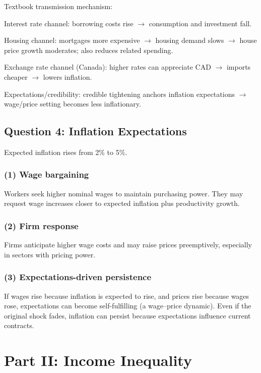 \documentclass[11pt]{article}
\begin{document}
Textbook transmission mechanism:

Interest rate channel: borrowing costs rise \(\rightarrow\) consumption and investment fall.

Housing channel: mortgages more expensive \(\rightarrow\) housing demand slows \(\rightarrow\) house price growth moderates; also reduces related spending.

Exchange rate channel (Canada): higher rates can appreciate CAD \(\rightarrow\) imports cheaper \(\rightarrow\) lowers inflation.

Expectations/credibility: credible tightening anchors inflation expectations \(\rightarrow\) wage/price setting becomes less inflationary.

\subsection*{Question 4: Inflation Expectations}

Expected inflation rises from 2\% to 5\%.

\subsubsection*{(1) Wage bargaining}

Workers seek higher nominal wages to maintain purchasing power. They may request wage increases closer to expected inflation plus productivity growth.

\subsubsection*{(2) Firm response}

Firms anticipate higher wage costs and may raise prices preemptively, especially in sectors with pricing power.

\subsubsection*{(3) Expectations-driven persistence}

If wages rise because inflation is expected to rise, and prices rise because wages rose, expectations can become self-fulfilling (a wage--price dynamic). Even if the original shock fades, inflation can persist because expectations influence current contracts.

\section*{Part II: Income Inequality}
\end{document}
